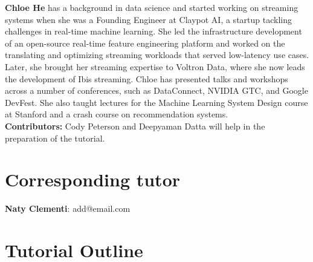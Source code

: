 \documentclass[sigconf]{acmart}
\begin{document}
\textbf{Chloe He} has a background in data science and started working on streaming systems
when she was a Founding Engineer at Claypot AI, a startup tackling challenges in
real-time machine learning. She led the infrastructure development of an
open-source real-time feature engineering platform and worked on the translating
and optimizing streaming workloads that served low-latency use cases. Later, she
brought her streaming expertise to Voltron Data, where she now leads the
development of Ibis streaming. Chloe has presented talks and workshops across a number of 
conferences, such as DataConnect, NVIDIA GTC, and Google DevFest. She also taught lectures
for the Machine Learning System Design course at Stanford and a crash course on
recommendation systems. \\

\textbf{Contributors:} Cody Peterson and Deepyaman Datta will help in the preparation of the tutorial. 

\section{Corresponding tutor}

\textbf{Naty Clementi}: add@email.com 

\section{Tutorial Outline}
\end{document}
